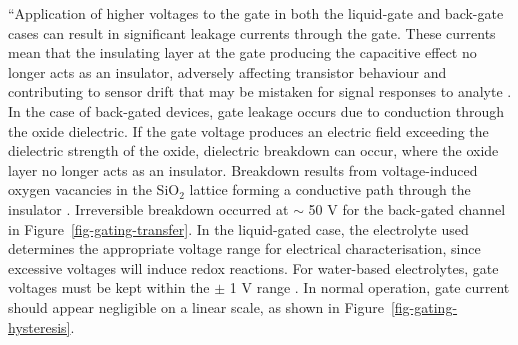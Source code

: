 \documentclass[
  a4paper,
]{scrbook}
\begin{document}
``Application of higher voltages to the gate in both the liquid-gate and
back-gate cases can result in significant leakage currents through the
gate. These currents mean that the insulating layer at the gate
producing the capacitive effect no longer acts as an insulator,
adversely affecting transistor behaviour and contributing to sensor
drift that may be mistaken for signal responses to analyte
\autocite{Noyce2019,Shkodra2021,Albarghouthi2022}. In the case of
back-gated devices, gate leakage occurs due to conduction through the
oxide dielectric. If the gate voltage produces an electric field
exceeding the dielectric strength of the oxide, dielectric breakdown can
occur, where the oxide layer no longer acts as an insulator. Breakdown
results from voltage-induced oxygen vacancies in the SiO\(_2\) lattice
forming a conductive path through the insulator \autocite{Padovani2017}.
Irreversible breakdown occurred at \(\sim\) 50 V for the back-gated
channel in Figure~\ref{fig-gating-transfer}. In the liquid-gated case,
the electrolyte used determines the appropriate voltage range for
electrical characterisation, since excessive voltages will induce redox
reactions. For water-based electrolytes, gate voltages must be kept
within the \(\pm\) 1 V range \autocite{Wang2010,Ohno2015,Shkodra2021}.
In normal operation, gate current should appear negligible on a linear
scale, as shown in Figure~\ref{fig-gating-hysteresis}.
\end{document}
